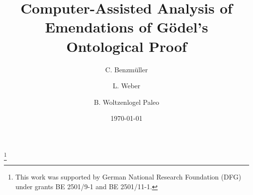 \documentclass{birkjour}
\theoremstyle{definition}
\theoremstyle{remark}
\numberwithin{equation}{section}
\begin{document}
%
%
%
%
%
%
%
%
%


\title[Analysis of Emendations of G\"odel's Ontological Argument]
 {Computer-Assisted Analysis of 
 Emendations of G\"odel's Ontological Proof}



\author[Benzm\"uller]{C. Benzm\"uller}

\address{%
Dep.~of Mathematics and Computer Science, Freie Universit\"at Berlin, Germany
}

\thanks{This work was supported by German National Research Foundation (DFG) under
 grants BE 2501/9-1 and BE 2501/11-1.}


\author[Weber]{L. Weber}
\address{ 
Dep.~of Mathematics and Computer Science, Freie Universit\"at Berlin, Germany
}


\author[Woltzenlogel-Paleo]{B. Woltzenlogel Paleo}
\address{ 
Room HA0402, Favoritenstra{\ss}e 9, 1040 Wien, Austria
}






\date{\today}
\dedicatory{ }

\end{document}
